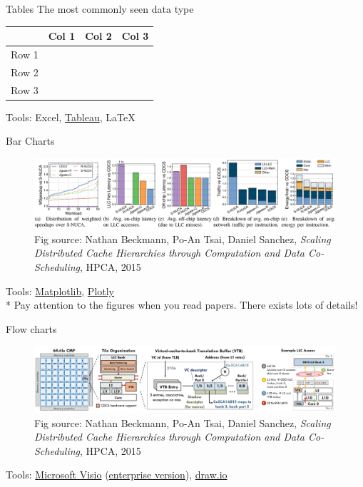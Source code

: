 \documentclass{../TexTemplate/myslide}
\begin{document}
\begin{frame}{Tables}
The most commonly seen data type
\begin{center}
\begin{tabular}{cccc}\hline
 & Col 1 & Col 2 & Col 3\\\hline
Row 1 & & &\\
Row 2 & & &\\
Row 3 & & &\\\hline
\end{tabular}
\end{center}
Tools: Excel, \href{https://www.tableau.com/}{Tableau}, \LaTeX
\end{frame}

\begin{frame}{Bar Charts}
\begin{figure}
\centering
\includegraphics[width=\linewidth]{fig/bar_chart_eg.png}
\caption*{\small Fig source: Nathan Beckmann, Po-An Tsai, Daniel Sanchez, \emph{Scaling Distributed Cache Hierarchies through Computation and Data Co-Scheduling}, HPCA, 2015}
\end{figure}
Tools: \href{https://matplotlib.org/}{Matplotlib}, \href{https://plot.ly/}{Plotly}\\
* Pay attention to the figures when you read papers. There exists lots of details!
\end{frame}

\begin{frame}{Flow charts}
\begin{figure}
\centering
\includegraphics[width=\linewidth]{fig/flow_chart_eg.png}
\caption*{\small Fig source: Nathan Beckmann, Po-An Tsai, Daniel Sanchez, \emph{Scaling Distributed Cache Hierarchies through Computation and Data Co-Scheduling}, HPCA, 2015}
\end{figure}
Tools: \href{https://products.office.com/en-us/visio/flowchart-software}{Microsoft Visio} (\href{https://ms.sysu.edu.cn/}{enterprise version}), \href{https://www.draw.io/}{draw.io}
\end{frame}
\end{document}
